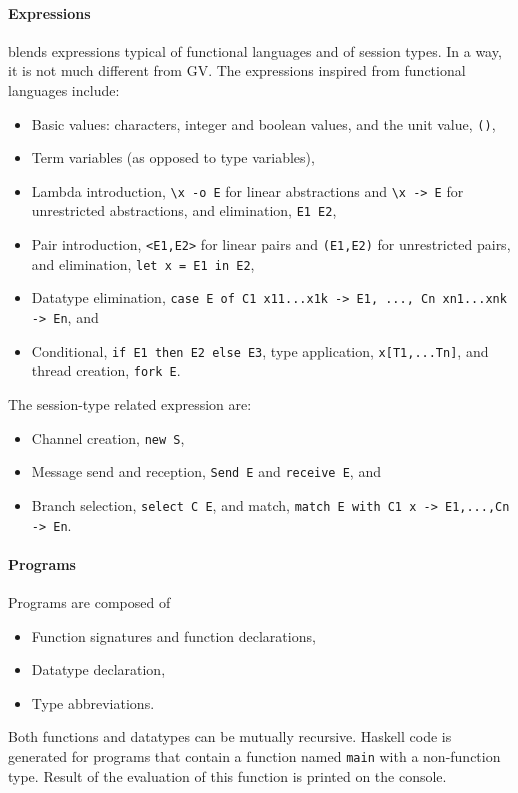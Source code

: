 \paragraph{Expressions}

\freest{} blends expressions typical of functional languages and of
session types. In a way, it is not much different from GV.
%
The expressions inspired from functional languages include:
%
\begin{itemize}
\item Basic values: characters, integer and boolean values, and the
  unit value, \lstinline|()|,
\item Term variables (as opposed to type variables),
\item Lambda introduction, \lstinline|\x -o E| for linear abstractions
  and \lstinline|\x -> E| for unrestricted abstractions, and
  elimination, \lstinline|E1 E2|,
\item Pair introduction, \lstinline|<E1,E2>| for linear pairs and
  \lstinline|(E1,E2)| for unrestricted pairs, and elimination,
  \lstinline|let x = E1 in E2|,
\item Datatype elimination,
  \lstinline|case E of C1 x11...x1k -> E1, ..., Cn xn1...xnk -> En|, and
\item Conditional, \lstinline|if E1 then E2 else E3|, type
  application, \lstinline|x[T1,...Tn]|, and thread creation,
  \lstinline|fork E|.
\end{itemize}

The session-type related expression are:
%
\begin{itemize}
\item Channel creation, \lstinline|new S|,
\item Message send and reception, \lstinline|Send E| and
  \lstinline|receive E|, and
\item Branch selection, \lstinline|select C E|, and match,
  \lstinline|match E with C1 x -> E1,...,Cn -> En|.
\end{itemize}

\paragraph{Programs}

Programs are composed of
%
\begin{itemize}
\item Function signatures and function declarations, 
\item Datatype declaration,
\item Type abbreviations.
\end{itemize}

Both functions and datatypes can be mutually recursive. Haskell code
is generated for programs that contain a function named
\lstinline|main| with a non-function type. Result of the evaluation of
this function is printed on the console.

